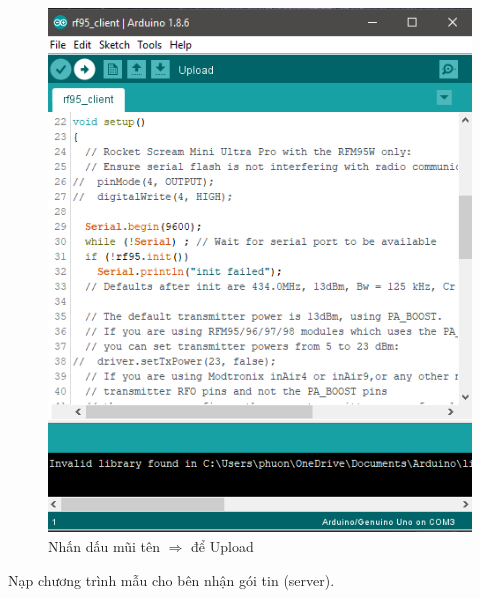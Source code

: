 \begin{enumerate}
\begin{center}
\begin{figure}[htp]
\begin{center}
\includegraphics[scale=0.8]{image4/arduino14.png}
\end{center}
\caption{Nhấn dấu mũi tên \textbf{$\Rightarrow$} để Upload}
\end{figure}
\end{center}
\end{enumerate}
\newpage
Nạp chương trình mẫu cho bên nhận gói tin (server).
